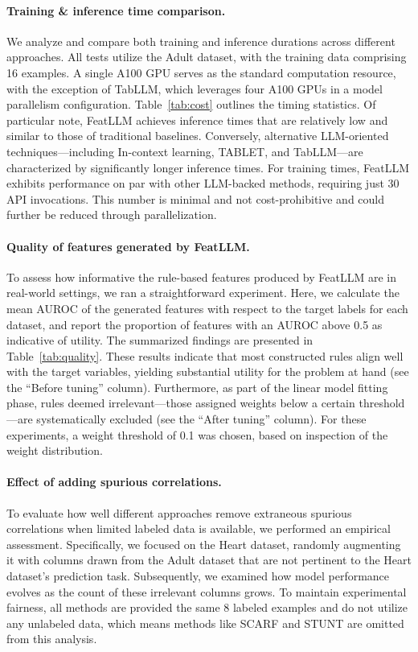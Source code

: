 \vspace*{-0.12in}
\paragraph{Training \& inference time comparison.} We analyze and compare both training and inference durations across different approaches. All tests utilize the Adult dataset, with the training data comprising 16 examples. A single A100 GPU serves as the standard computation resource, with the exception of TabLLM, which leverages four A100 GPUs in a model parallelism configuration. Table~\ref{tab:cost} outlines the timing statistics. Of particular note, \textsf{FeatLLM} achieves inference times that are relatively low and similar to those of traditional baselines. Conversely, alternative LLM-oriented techniques—including In-context learning, TABLET, and TabLLM—are characterized by significantly longer inference times. For training times, \textsf{FeatLLM} exhibits performance on par with other LLM-backed methods, requiring just 30 API invocations. This number is minimal and not cost-prohibitive and could further be reduced through parallelization.

\vspace*{-0.12in}
\paragraph{Quality of features generated by \textsf{FeatLLM}.}
To assess how informative the rule-based features produced by \textsf{FeatLLM} are in real-world settings, we ran a straightforward experiment. Here, we calculate the mean AUROC of the generated features with respect to the target labels for each dataset, and report the proportion of features with an AUROC above 0.5 as indicative of utility. The summarized findings are presented in Table~\ref{tab:quality}. These results indicate that most constructed rules align well with the target variables, yielding substantial utility for the problem at hand (see the ``Before tuning'' column). Furthermore, as part of the linear model fitting phase, rules deemed irrelevant—those assigned weights below a certain threshold—are systematically excluded (see the ``After tuning'' column). For these experiments, a weight threshold of 0.1 was chosen, based on inspection of the weight distribution.

\vspace*{-0.12in}
\paragraph{Effect of adding spurious correlations.} To evaluate how well different approaches remove extraneous spurious correlations when limited labeled data is available, we performed an empirical assessment. Specifically, we focused on the Heart dataset, randomly augmenting it with columns drawn from the Adult dataset that are not pertinent to the Heart dataset’s prediction task. Subsequently, we examined how model performance evolves as the count of these irrelevant columns grows. To maintain experimental fairness, all methods are provided the same 8 labeled examples and do not utilize any unlabeled data, which means methods like SCARF and STUNT are omitted from this analysis.

